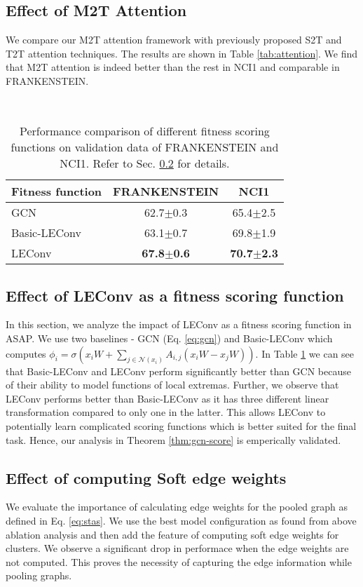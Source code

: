 \documentclass[letterpaper]{article} \usepackage{aaai20}  \usepackage{times}  \usepackage{helvet} \usepackage{courier}  \usepackage[hyphens]{url}  \usepackage{graphicx} \urlstyle{rm} \def\UrlFont{\rm}  \usepackage{graphicx}  \frenchspacing  \setlength{\pdfpagewidth}{8.5in}  \setlength{\pdfpageheight}{11in}
\begin{document}
\subsection{Effect of M2T Attention}
\label{sec:ablation_attn}
We compare our M2T attention framework with previously proposed S2T and T2T attention techniques. The results are shown in Table \ref{tab:attention}. We find that M2T attention is indeed better than the rest in NCI1 and comparable in FRANKENSTEIN.

\begin{table}[!ht]\
	\centering
	\begin{tabular}{lcc}
		\toprule
		Fitness function & \textsc{FRANKENSTEIN} & \textsc{NCI1} \\
		\midrule
		GCN & 62.7$\pm$0.3 & 65.4$\pm$2.5 \\
		Basic-LEConv & 63.1$\pm$0.7 & 69.8$\pm$1.9 \\
		LEConv & \textbf{67.8$\pm$0.6} & \textbf{70.7$\pm$2.3} \\
		\bottomrule
	\end{tabular}
	\caption{\label{tab:leconv} Performance comparison of different fitness scoring functions on validation data of FRANKENSTEIN and NCI1. Refer to Sec. \ref{sec:ablation_fitness} for details.}
\end{table}

\subsection{Effect of LEConv as a fitness scoring function}
\label{sec:ablation_fitness}
In this section, we analyze the impact of LEConv as a fitness scoring function in ASAP. We use two baselines - GCN (Eq. \ref{eq:gcn}) and Basic-LEConv which computes $\phi_{i} = \sigma(x_{i}W + \sum_{j \in \mathcal{N}(x_{i})} A_{i, j} (x_{i}W-x_{j}W))$. In Table \ref{tab:leconv} we can see that Basic-LEConv and LEConv perform significantly better than GCN because of their ability to model functions of local extremas. Further, we observe that LEConv performs better than Basic-LEConv as it has three different linear transformation compared to only one in the latter. This allows LEConv to potentially learn complicated scoring functions which is better suited for the final task. Hence, our analysis in Theorem \ref{thm:gcn-score} is emperically validated.


\subsection{Effect of computing Soft edge weights}
\label{sec:ablation_edge}
We evaluate the importance of calculating edge weights for the pooled graph as defined in Eq. \ref{eq:stas}. We use the best model configuration as found from above ablation analysis and then add the feature of computing soft edge weights for clusters. We observe a significant drop in performace when the edge weights are not computed. This proves the necessity of capturing the edge information while pooling graphs.
\end{document}
